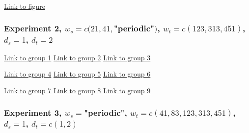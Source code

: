 \begin{framed}
\begin{center}
  \href{../plots/a1950/E1/tmax.mean.absmeans.error.tw.pdf}{Link to figure}
  \label{e1.abserror.tw}
\end{center}
\end{framed}




\subsubsection{Experiment 2,  
\textmd{$w_s=c(21, 41, $"periodic"$)$, $w_t=c(123, 313, 451)$, $d_s=1$, $d_t=2$}
}

\begin{framed}
\begin{center}
  \href{../plots/a1950/E2/QQ.error.tmax.group.1.pdf}{Link to group 1} 
  \;\;\;\;\;\;\;\;\;\;
  \href{../plots/a1950/E2/QQ.error.tmax.group.2.pdf}{Link to group 2} 
  \;\;\;\;\;\;\;\;\;\;
  \href{../plots/a1950/E2/QQ.error.tmax.group.3.pdf}{Link to group 3}
\end{center}
\begin{center}
  \href{../plots/a1950/E2/QQ.error.tmax.group.4.pdf}{Link to group 4} 
  \;\;\;\;\;\;\;\;\;\;
  \href{../plots/a1950/E2/QQ.error.tmax.group.5.pdf}{Link to group 5} 
  \;\;\;\;\;\;\;\;\;\;
  \href{../plots/a1950/E2/QQ.error.tmax.group.6.pdf}{Link to group 6}
\end{center}
\begin{center}
  \href{../plots/a1950/E2/QQ.error.tmax.group.7.pdf}{Link to group 7} 
  \;\;\;\;\;\;\;\;\;\;
  \href{../plots/a1950/E2/QQ.error.tmax.group.8.pdf}{Link to group 8} 
  \;\;\;\;\;\;\;\;\;\;
  \href{../plots/a1950/E2/QQ.error.tmax.group.9.pdf}{Link to group 9}
  \label{QQ.error.laggroup}
\end{center}
\end{framed}

\subsubsection{Experiment 3,  
\textmd{$w_s=$"periodic", $w_t=c(41, 83, 123, 313, 451)$, $d_s=1$, $d_t=c(1,2)$}
}

